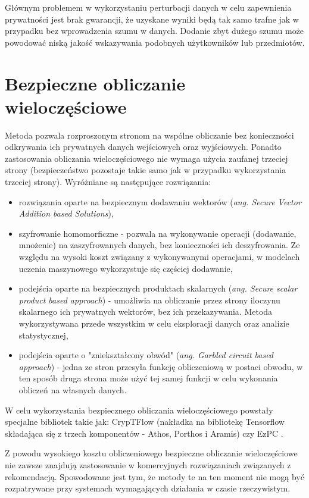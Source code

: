 Głównym problemem w wykorzystaniu perturbacji danych w celu zapewnienia prywatności jest brak gwarancji, że uzyskane wyniki będą tak samo trafne jak w przypadku bez wprowadzenia szumu w danych. Dodanie zbyt dużego szumu może powodować niską jakość wskazywania podobnych użytkowników lub przedmiotów.



\section{Bezpieczne obliczanie wieloczęściowe}

Metoda pozwala rozproszonym stronom na wspólne obliczanie bez konieczności odkrywania ich prywatnych danych wejściowych oraz wyjściowych. Ponadto zastosowania obliczania wieloczęściowego nie wymaga użycia zaufanej trzeciej strony (bezpieczeństwo pozostaje takie samo jak w przypadku wykorzystania trzeciej strony). 
Wyróżniane są następujące rozwiązania:
\begin{itemize}
    \item rozwiązania oparte na bezpiecznym dodawaniu wektorów (\textit{ang. Secure Vector Addition based Solutions}),
    \item szyfrowanie homomorficzne - pozwala na wykonywanie operacji (dodawanie, mnożenie) na zaszyfrowanych danych, bez konieczności ich deszyfrowania. Ze względu na wysoki koszt związany z wykonywanymi operacjami, w modelach uczenia maszynowego wykorzystuje się częściej dodawanie,
    \item podejścia oparte na bezpiecznych produktach skalarnych (\textit{ang. Secure scalar product based approach}) - umożliwia na obliczanie przez strony iloczynu skalarnego ich prywatnych wektorów, bez ich przekazywania. Metoda wykorzystywana przede wszystkim w celu eksploracji danych oraz analizie statystycznej,
    \item podejścia oparte o "zniekształcony obwód" (\textit{ang. Garbled circuit based approach}) - jedna ze stron przesyła funkcję obliczeniową w postaci obwodu, w ten sposób druga strona może użyć tej samej funkcji w celu wykonania obliczeń na własnych danych.
\end{itemize}

W celu wykorzystania bezpiecznego obliczania wieloczęściowego powstały specjalne bibliotek takie jak: CrypTFlow (nakładka na bibliotekę Tensorflow składająca się z trzech komponentów - Athos, Porthos i Aramis) \cite{kumar2020cryptflow} czy EzPC \cite{chandran2019ezpc}.

Z powodu wysokiego kosztu obliczeniowego bezpieczne obliczanie wieloczęściowe nie zawsze znajdują zastosowanie w komercyjnych rozwiązaniach związanych z rekomendacją. Spowodowane jest tym, że metody te na ten moment nie mogą być rozpatrywane przy systemach wymagających działania w czasie rzeczywistym. \cite{secureMultipartyComputation}

